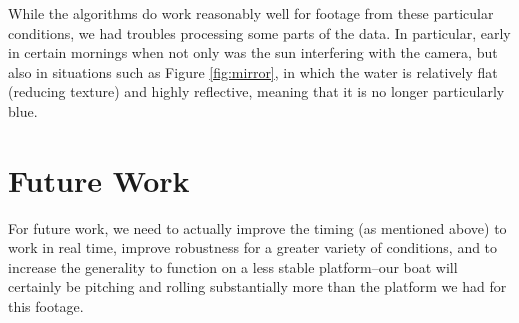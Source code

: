 \documentclass{article}
\begin{document}
While the algorithms do work reasonably well for footage from these particular
conditions, we had troubles processing some parts of the data. In particular,
early in certain mornings when not only was the sun interfering with the camera,
but also in situations such as Figure \ref{fig:mirror}, in which the water is
relatively flat (reducing texture) and highly reflective, meaning that it is no
longer particularly blue.

\section{Future Work}

For future work, we need to actually improve the timing (as mentioned above) to
work in real time, improve robustness for a greater variety of conditions, and
to increase the generality to function on a less stable platform--our boat will
certainly be pitching and rolling substantially more than the platform we had
for this footage.



\end{document}

